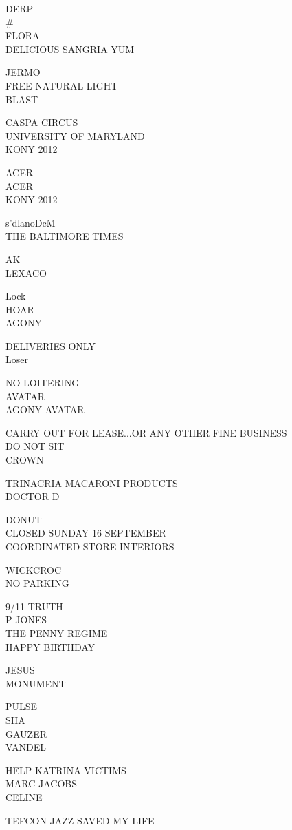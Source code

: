 \documentclass[10pt,letterpaper]{article}
\begin{document}
DERP\\
\#\\
FLORA\\
DELICIOUS SANGRIA YUM

JERMO\\
FREE NATURAL LIGHT\\
BLAST

CASPA CIRCUS\\
UNIVERSITY OF MARYLAND\\
KONY 2012

ACER\\
ACER\\
KONY 2012

s'dlanoDcM\\
THE BALTIMORE TIMES

AK\\
LEXACO

Lock\\
HOAR\\
AGONY

DELIVERIES ONLY\\
Loser

NO LOITERING\\
AVATAR\\
AGONY AVATAR

CARRY OUT FOR LEASE...OR ANY OTHER FINE BUSINESS\\
DO NOT SIT\\
CROWN

TRINACRIA MACARONI PRODUCTS\\
DOCTOR D

DONUT\\
CLOSED SUNDAY 16 SEPTEMBER\\
COORDINATED STORE INTERIORS

WICKCROC\\
NO PARKING

9/11 TRUTH\\
P{-}JONES\\
THE PENNY REGIME\\
HAPPY BIRTHDAY

JESUS\\
MONUMENT

PULSE\\
SHA\\
GAUZER\\
VANDEL

HELP KATRINA VICTIMS\\
MARC JACOBS\\
CELINE

TEFCON JAZZ SAVED MY LIFE
\
\end{document}
